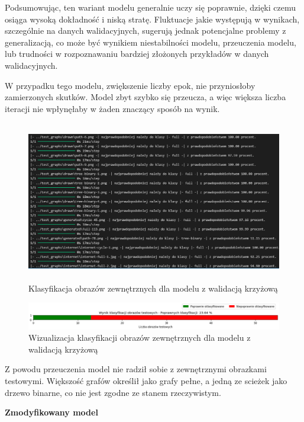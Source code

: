 Podsumowując, ten wariant modelu generalnie uczy się poprawnie, dzięki czemu osiąga wysoką dokładność i niską stratę.
Fluktuacje jakie występują w wynikach, szczególnie na danych walidacyjnych,
sugerują jednak potencjalne problemy z generalizacją, co może być wynikiem niestabilności modelu,
przeuczenia modelu, lub trudności w rozpoznawaniu bardziej złożonych przykładów w danych walidacyjnych.

W przypadku tego modelu, zwiększenie liczby epok, nie przyniosłoby zamierzonych skutków.
Model zbyt szybko się przeucza, a więc większa liczba iteracji nie wpłynęłaby w żaden znaczący sposób na wynik.

\begin{figure}[ht]
	\centering
	\includegraphics[height=7cm]{resources/tests/images/v3/crossvalid_txt.png}
	\caption{Klasyfikacja obrazów zewnętrznych dla modelu z walidacją krzyżową}
	\label{Fig:tests-cv-0b}
\end{figure}
\FloatBarrier

\begin{figure}[ht]
	\centering
	\includegraphics[width=14cm]{resources/tests/images/v3/crossvalid_bar.png}
	\caption{Wizualizacja klasyfikacji obrazów zewnętrznych dla modelu z walidacją krzyżową}
	\label{Fig:tests-cv-0c}
\end{figure}
\FloatBarrier

Z powodu przeuczenia model nie radził sobie z zewnętrznymi obrazkami testowymi.
Większość grafów określił jako grafy pełne, a jedną ze scieżek jako drzewo binarne,
co nie jest zgodne ze stanem rzeczywistym.

\textbf{Zmodyfikowany model}

